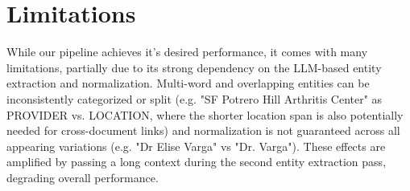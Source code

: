 





 
\section{Limitations}
While our pipeline achieves it's desired performance, it comes with many limitations, partially due to its strong dependency on the LLM-based entity extraction and normalization. Multi-word and overlapping entities can be inconsistently categorized or split (e.g. "SF Potrero Hill Arthritis Center" as PROVIDER vs. LOCATION, where the shorter location span is also potentially needed for cross-document links) and normalization is not guaranteed across all appearing variations (e.g. "Dr Elise Varga" vs "Dr. Varga"). These effects are amplified by passing a long context during the second entity extraction pass, degrading overall performance.


